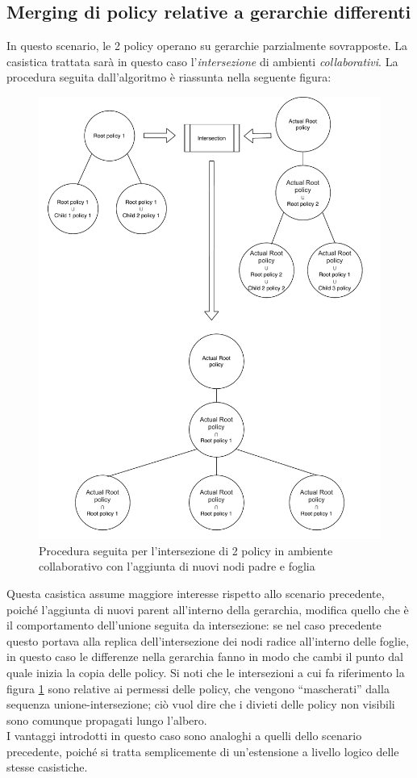 \documentclass[12pt,a4paper,twoside]{book}
\begin{document}
\subsection{Merging di policy relative a gerarchie differenti}
In questo scenario, le 2 policy operano su gerarchie parzialmente sovrapposte. La casistica trattata sarà in questo caso l'\textit{intersezione} di ambienti \textit{collaborativi}. La procedura seguita dall'algoritmo è riassunta nella seguente figura:
\begin{figure}[H]
\centering
\includegraphics[scale=.64]{../immagini/treeNewNodesExample.pdf}
\caption{Procedura seguita per l'intersezione di 2 policy in ambiente collaborativo con l'aggiunta di nuovi nodi padre e foglia}
\label{treeNewNodeExample}
\end{figure}
Questa casistica assume maggiore interesse rispetto allo scenario precedente, poiché l'aggiunta di nuovi parent all'interno della gerarchia, modifica quello che è il comportamento dell'unione seguita da intersezione: se nel caso precedente questo portava alla replica dell'intersezione dei nodi radice all'interno delle foglie, in questo caso le differenze nella gerarchia fanno in modo che cambi il punto dal quale inizia la copia delle policy. Si noti che le intersezioni a cui fa riferimento la figura \ref{treeNewNodeExample} sono relative ai permessi delle policy, che vengono ``mascherati'' dalla sequenza unione-intersezione; ciò vuol dire che i divieti delle policy non visibili sono comunque propagati lungo l'albero.\\
I vantaggi introdotti in questo caso sono analoghi a quelli dello scenario precedente, poiché si tratta semplicemente di un'estensione a livello logico delle stesse casistiche. 
{}

\end{document}
